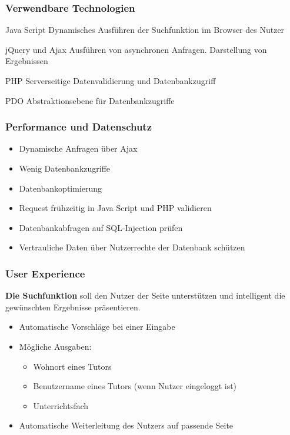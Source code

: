 \begin{frame} 
  \frametitle{Verwendbare Technologien}
  \begin{block}{Java Script}
    Dynamisches Ausführen der Suchfunktion im Browser des Nutzer
  \end{block}
  \begin{block}{jQuery und Ajax}
    Ausführen von asynchronen Anfragen. Darstellung von Ergebnissen
  \end{block}
  \begin{block}{PHP}
    Serverseitige Datenvalidierung und Datenbankzugriff
  \end{block}
  \begin{block}{PDO}
    Abstraktionsebene für Datenbankzugriffe
  \end{block}
\end{frame}

\begin{frame} 
  \frametitle{Performance und Datenschutz}
  \begin{itemize}
    \item Dynamische Anfragen über Ajax
    \item Wenig Datenbankzugriffe
    \item Datenbankoptimierung
  \end{itemize} 
  \begin{itemize}
    \item Request frühzeitig in Java Script und PHP validieren 
    \item Datenbankabfragen auf SQL-Injection prüfen
    \item Vertrauliche Daten über Nutzerrechte der Datenbank schützen
  \end{itemize}
\end{frame}

\begin{frame}
  \frametitle{User Experience}
  \textbf{Die Suchfunktion} soll den Nutzer der Seite unterstützen und intelligent die 
  gewünschten Ergebnisse präsentieren. \newline \newline
  \begin{itemize}
    \item Automatische Vorschläge bei einer Eingabe
    \item Mögliche Ausgaben:
    \begin{itemize}
      \item Wohnort eines Tutors
      \item Benutzername eines Tutors (wenn Nutzer eingeloggt ist)
      \item Unterrichtsfach
    \end{itemize}
    \item Automatische Weiterleitung des Nutzers auf passende Seite
  \end{itemize} 
 \end{frame}
 
